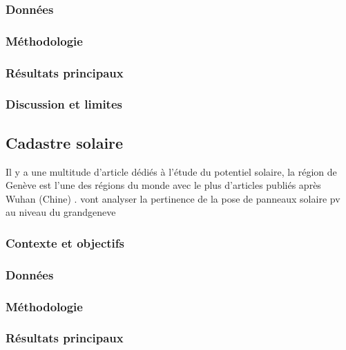 \subsubsection{Données}

\subsubsection{Méthodologie}

\subsubsection{Résultats principaux}

\subsubsection{Discussion et limites}

\subsection{Cadastre solaire}

\par{Il y a une multitude d'article dédiés à l'étude du potentiel solaire, la région de Genève est l'une des régions du monde avec le plus d'articles publiés après Wuhan (Chine) \cite{drozd_evaluating_2025}. \citeauthor{thebault_large-scale_2022} \cite{thebault_large-scale_2022} vont analyser la pertinence de la pose de panneaux solaire \acrshort{pv} au niveau du \gls{grandgeneve}}


\subsubsection{Contexte et objectifs}

\subsubsection{Données}

\subsubsection{Méthodologie}

\subsubsection{Résultats principaux}

